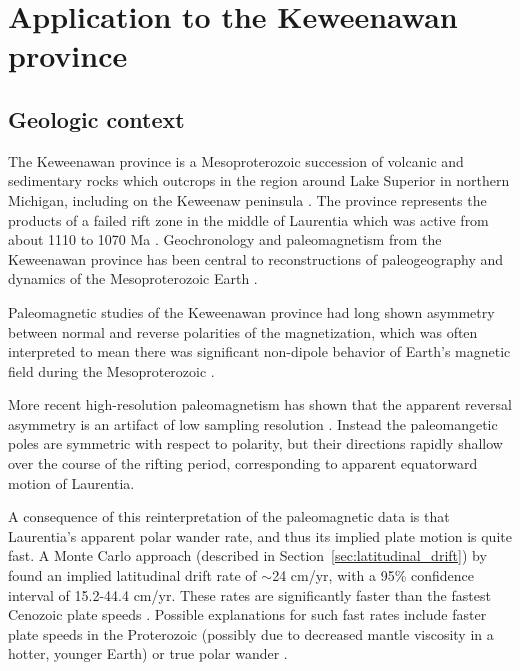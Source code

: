 \documentclass[preprint,12pt,authoryear]{elsarticle}
\begin{document}
\section{Application to the Keweenawan province}
\label{sec:keweenawan}
\subsection{Geologic context}
The Keweenawan province is a Mesoproterozoic succession of volcanic and sedimentary rocks
which outcrops in the region around Lake Superior in northern Michigan, including on the Keweenaw peninsula \citep{henry1977paleomagnetism}.
The province represents the products of a failed rift zone in the middle of Laurentia which was active
from about 1110 to 1070 Ma \citep{swanson2014magmatic}.
Geochronology and paleomagnetism from the Keweenawan province has been central to reconstructions
of paleogeography and dynamics of the Mesoproterozoic Earth \citep[e.g.][]{li2008assembly, evans2009palaeomagnetically}.

Paleomagnetic studies of the Keweenawan province had long shown asymmetry between normal and
reverse polarities of the magnetization, which was often interpreted to mean there was significant 
non-dipole behavior of Earth's magnetic field during the Mesoproterozoic \citep{pesonen1981late, nevanlinna1983late, pesonen1983geomagnetic}.

More recent high-resolution paleomagnetism has shown that the apparent reversal asymmetry
is an artifact of low sampling resolution \citep{swanson2009no, kulakov2013paleomagnetism}. 
Instead the paleomangetic poles are symmetric with respect to polarity,
but their directions rapidly shallow over the course of the rifting period,
corresponding to apparent equatorward motion of Laurentia.

A consequence of this reinterpretation of the paleomagnetic data is that Laurentia's apparent
polar wander rate, and thus its implied plate motion is quite fast.
A Monte Carlo approach (described in Section~\ref{sec:latitudinal_drift}) by \citet{swanson2014confirmation}
found an implied latitudinal drift rate of $\sim$24 cm/yr, with a 95\% confidence interval of 15.2-44.4 cm/yr.
These rates are significantly faster than the fastest Cenozoic plate speeds \citep{zahirovic2015tectonic}.
Possible explanations for such fast rates include faster plate speeds in the Proterozoic (possibly due to decreased
mantle viscosity in a hotter, younger Earth) or true polar wander \citep{swanson2009no}.
\end{document}
